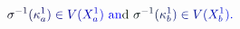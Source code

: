 \documentclass[12pt]{article}
\begin{document}
\makeatletter
\renewcommand*{\@textcolor}[3]{%
  \protect\leavevmode
  \begingroup
    \color#1{#2}#3%
  \endgroup
}
\makeatother
\begin{displaymath}
\mathcolor[RGB]{0,0,15}{\sigma} ^ { \mathcolor[RGB]{0,0,30}{-} \mathcolor[RGB]{0,0,45}{1} } \mathcolor[RGB]{0,0,60}{(} \mathcolor[RGB]{0,0,75}{\kappa} _ { \mathcolor[RGB]{0,0,90}{a} } ^ { \mathcolor[RGB]{0,0,105}{1} } \mathcolor[RGB]{0,0,120}{)} \mathcolor[RGB]{0,0,135}{\in} \mathcolor[RGB]{0,0,150}{V} \mathcolor[RGB]{0,0,165}{(} \mathcolor[RGB]{0,0,180}{X} _ { \mathcolor[RGB]{0,0,195}{a} } ^ { \mathcolor[RGB]{0,0,210}{1} } \mathcolor[RGB]{0,0,225}{)} \mathrm { ~ \mathcolor[RGB]{0,0,240}{a} \mathcolor[RGB]{0,0,255}{n} \mathcolor[RGB]{0,15,0}{d} ~ } \mathcolor[RGB]{0,15,15}{\sigma} ^ { \mathcolor[RGB]{0,15,30}{-} \mathcolor[RGB]{0,15,45}{1} } \mathcolor[RGB]{0,15,60}{(} \mathcolor[RGB]{0,15,75}{\kappa} _ { \mathcolor[RGB]{0,15,90}{b} } ^ { \mathcolor[RGB]{0,15,105}{1} } \mathcolor[RGB]{0,15,120}{)} \mathcolor[RGB]{0,15,135}{\in} \mathcolor[RGB]{0,15,150}{V} \mathcolor[RGB]{0,15,165}{(} \mathcolor[RGB]{0,15,180}{X} _ { \mathcolor[RGB]{0,15,195}{b} } ^ { \mathcolor[RGB]{0,15,210}{1} } \mathcolor[RGB]{0,15,225}{)} \mathcolor[RGB]{0,15,240}{.}
\end{displaymath}
\end{document}
